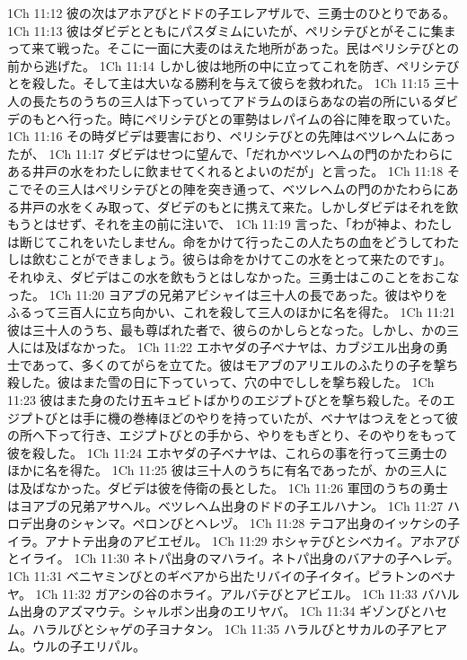 1Ch 11:12  彼の次はアホアびとドドの子エレアザルで、三勇士のひとりである。
1Ch 11:13  彼はダビデとともにパスダミムにいたが、ペリシテびとがそこに集まって来て戦った。そこに一面に大麦のはえた地所があった。民はペリシテびとの前から逃げた。
1Ch 11:14  しかし彼は地所の中に立ってこれを防ぎ、ペリシテびとを殺した。そして主は大いなる勝利を与えて彼らを救われた。
1Ch 11:15  三十人の長たちのうちの三人は下っていってアドラムのほらあなの岩の所にいるダビデのもとへ行った。時にペリシテびとの軍勢はレパイムの谷に陣を取っていた。
1Ch 11:16  その時ダビデは要害におり、ペリシテびとの先陣はベツレヘムにあったが、
1Ch 11:17  ダビデはせつに望んで、「だれかベツレヘムの門のかたわらにある井戸の水をわたしに飲ませてくれるとよいのだが」と言った。
1Ch 11:18  そこでその三人はペリシテびとの陣を突き通って、ベツレヘムの門のかたわらにある井戸の水をくみ取って、ダビデのもとに携えて来た。しかしダビデはそれを飲もうとはせず、それを主の前に注いで、
1Ch 11:19  言った、「わが神よ、わたしは断じてこれをいたしません。命をかけて行ったこの人たちの血をどうしてわたしは飲むことができましょう。彼らは命をかけてこの水をとって来たのです」。それゆえ、ダビデはこの水を飲もうとはしなかった。三勇士はこのことをおこなった。
1Ch 11:20  ヨアブの兄弟アビシャイは三十人の長であった。彼はやりをふるって三百人に立ち向かい、これを殺して三人のほかに名を得た。
1Ch 11:21  彼は三十人のうち、最も尊ばれた者で、彼らのかしらとなった。しかし、かの三人には及ばなかった。
1Ch 11:22  エホヤダの子ベナヤは、カブジエル出身の勇士であって、多くのてがらを立てた。彼はモアブのアリエルのふたりの子を撃ち殺した。彼はまた雪の日に下っていって、穴の中でししを撃ち殺した。
1Ch 11:23  彼はまた身のたけ五キュビトばかりのエジプトびとを撃ち殺した。そのエジプトびとは手に機の巻棒ほどのやりを持っていたが、ベナヤはつえをとって彼の所へ下って行き、エジプトびとの手から、やりをもぎとり、そのやりをもって彼を殺した。
1Ch 11:24  エホヤダの子ベナヤは、これらの事を行って三勇士のほかに名を得た。
1Ch 11:25  彼は三十人のうちに有名であったが、かの三人には及ばなかった。ダビデは彼を侍衛の長とした。
1Ch 11:26  軍団のうちの勇士はヨアブの兄弟アサヘル。ベツレヘム出身のドドの子エルハナン。
1Ch 11:27  ハロデ出身のシャンマ。ペロンびとヘレヅ。
1Ch 11:28  テコア出身のイッケシの子イラ。アナトテ出身のアビエゼル。
1Ch 11:29  ホシャテびとシベカイ。アホアびとイライ。
1Ch 11:30  ネトパ出身のマハライ。ネトパ出身のバアナの子ヘレデ。
1Ch 11:31  ベニヤミンびとのギベアから出たリバイの子イタイ。ピラトンのベナヤ。
1Ch 11:32  ガアシの谷のホライ。アルバテびとアビエル。
1Ch 11:33  バハルム出身のアズマウテ。シャルボン出身のエリヤバ。
1Ch 11:34  ギゾンびとハセム。ハラルびとシャゲの子ヨナタン。
1Ch 11:35  ハラルびとサカルの子アヒアム。ウルの子エリパル。
